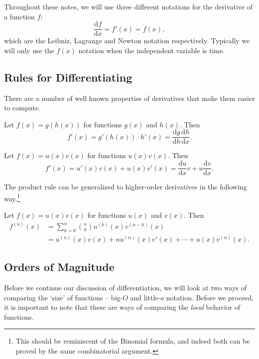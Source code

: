 \documentclass[a4paper]{scrreprt}
\newcommand{\dd}{\mathrm{d}}
\begin{document}
Throughout these notes, we will use three different notations for the derivative of a function $f$: 
$$
\frac{\dd f}{\dd x} = f'(x) = \dot{f}(x),
$$
which are the Leibniz, Lagrange and Newton notation respectively. Typically we will only use the $\dot{f}(x)$ notation when the independent variable is time.

\subsection{Rules for Differentiating}

There are a number of well known properties of derivatives that make them easier to compute.

\begin{theorem}
	Let $f(x) = g(h(x))$ for functions $g(x)$ and $h(x)$. Then
$$
f'(x) = g'(h(x))\cdot h'(x) = \frac{\dd g}{\dd h} \frac{\dd h}{\dd x}.
$$
\end{theorem}

\begin{theorem}
	Let $f(x) = u(x)v(x)$ for functions $u(x)v(x)$. Then
	$$
	f'(x) = u'(x) v(x) + u(x)v'(x) = \frac{\dd u}{\dd x} v + u\frac{\dd v}{\dd x}.
	$$
\end{theorem}

The product rule can be generalized to higher-order derivatives in the following way.\footnote{This should be reminiscent of the Binomial formula, and indeed both can be proved by the same combinatorial argument.}

\begin{theorem}
	Let $f(x) = u(x)v(x)$ for functions $u(x)$ and $v(x)$. Then
	\begin{align*}
		f^{(n)}(x) &= \sum_{k = 0}^n \binom{n}{k} u^{(k)} (x) v^{(n - k)}(x)\\
		&= u^{(n)}(x) v(x) + n u^{(n)}(x) v'(x) + \cdots + u(x)v^{(n)}(x).
	\end{align*}
\end{theorem}

\subsection{Orders of Magnitude}

Before we continue our discussion of differentiation, we will look at two ways of comparing the `size' of functions -- big-$O$ and little-$o$ notation. Before we proceed, it is important to note that these are ways of comparing the \emph{local} behavior of functions. 
\end{document}
